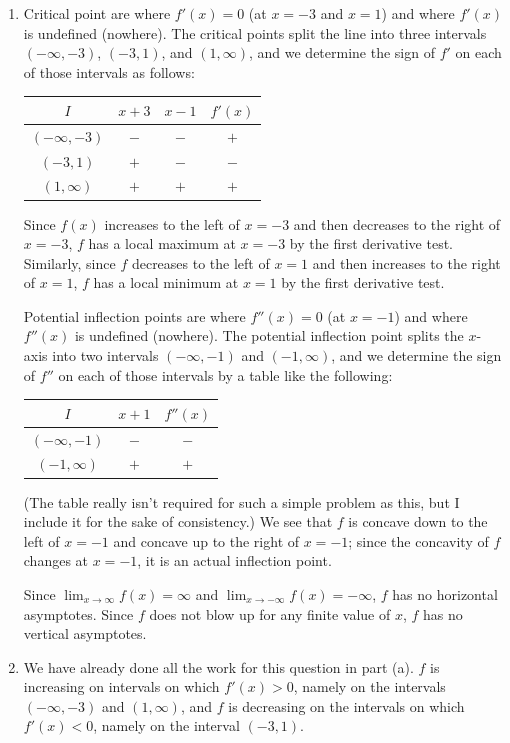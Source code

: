 \documentclass{article}
\begin{document}
\begin{enumerate}
  \begin{enumerate}
  \item Critical point are where $f'(x)=0$ (at $x=-3$ and $x=1$) and where
    $f'(x)$ is undefined (nowhere).  The critical points split the line
    into three intervals $(-\infty,-3)$, $(-3,1)$, and $(1,\infty)$, and
    we determine the sign of $f'$ on each of those intervals as follows:
    \begin{center}
      \begin{tabular}{|c|c|c|c|}
        \hline
	$I$            & $x+3$ & $x-1$ & $f'(x)$ 
	\\
	\hline
	$(-\infty,-3)$ & $-$   & $-$   & $+$ 
	\\
	$(-3,1)$       & $+$   & $-$   & $-$
	\\
	$(1,\infty)$   & $+$   & $+$   & $+$
	\\
	\hline
      \end{tabular}
    \end{center}
    Since $f(x)$ increases to the left of $x=-3$ 
    and then decreases to the right of $x=-3$, $f$ has a local maximum at
    $x=-3$ by the first derivative test.  Similarly, since $f$ decreases
    to the left of $x=1$ and then increases to the right of $x=1$, $f$
    has a local minimum at $x=1$ by the first derivative test.

    Potential inflection points are where $f''(x)=0$ (at $x=-1$) and where
    $f''(x)$ is undefined (nowhere).  The potential inflection point 
    splits the $x$-axis into two intervals $(-\infty,-1)$ and $(-1,\infty)$,
    and we determine the sign of $f''$ on each of those intervals
    by a table like the following:
    \begin{center}
      \begin{tabular}{|c|c|c|}
        \hline
	$I$            & $x+1$ & $f''(x)$ 
	\\
	\hline
	$(-\infty,-1)$ & $-$   & $-$ 
	\\
	$(-1,\infty)$  & $+$   & $+$
	\\
	\hline
      \end{tabular}
    \end{center}
    (The table really isn't required for such a simple problem as this,
    but I include it for the sake of consistency.)  We see that $f$ is
    concave down to the left of $x=-1$ and concave up to the right of
    $x=-1$; since the concavity of $f$ changes at $x=-1$, it is an actual
    inflection point.

    Since $\lim_{x\to\infty} f(x)=\infty$ and $\lim_{x\to -\infty} f(x)
    = -\infty$, $f$ has no horizontal asymptotes.  Since $f$ does not
    blow up for any finite value of $x$, $f$ has no vertical asymptotes.
  \item We have already done all the work for this question in part (a).
    $f$ is increasing on intervals on which $f'(x)>0$, namely on the
    intervals $(-\infty,-3)$ and $(1,\infty)$, and $f$ is decreasing
    on the intervals on which $f'(x)<0$, namely on the interval $(-3,1)$.


\end{enumerate}
\end{enumerate}
\end{document}

